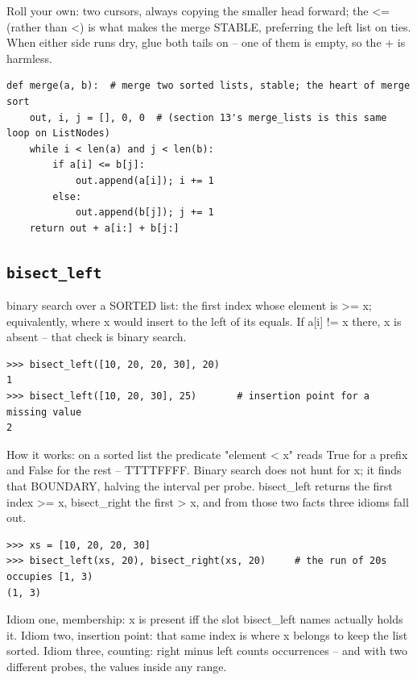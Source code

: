 \documentclass[10pt,letterpaper]{book}
\begin{document}
Roll your own: two cursors, always copying the smaller head forward; the <= (rather than <) is what makes the merge STABLE, preferring the left list on ties. When either side runs dry, glue both tails on -- one of them is empty, so the + is harmless.

\begin{lstlisting}[style=ex]
def merge(a, b):  # merge two sorted lists, stable; the heart of merge sort
    out, i, j = [], 0, 0  # (section 13's merge_lists is this same loop on ListNodes)
    while i < len(a) and j < len(b):
        if a[i] <= b[j]:
            out.append(a[i]); i += 1
        else:
            out.append(b[j]); j += 1
    return out + a[i:] + b[j:]
\end{lstlisting}

\subsection{\texttt{bisect\_left}}\label{def:bisect-left}
binary search over a SORTED list: the first index whose element is >= x; equivalently, where x would insert to the left of its equals. If a[i] != x there, x is absent -- that check is binary search.
\begin{lstlisting}[style=ex]
>>> bisect_left([10, 20, 20, 30], 20)
1
>>> bisect_left([10, 20, 30], 25)       # insertion point for a missing value
2
\end{lstlisting}

How it works: on a sorted list the predicate "element < x" reads True for a prefix and False for the rest -- TTTTFFFF. Binary search does not hunt for x; it finds that BOUNDARY, halving the interval per probe. bisect\_left returns the first index >= x, bisect\_right the first > x, and from those two facts three idioms fall out.

\begin{lstlisting}[style=ex]
>>> xs = [10, 20, 20, 30]
>>> bisect_left(xs, 20), bisect_right(xs, 20)     # the run of 20s occupies [1, 3)
(1, 3)
\end{lstlisting}

Idiom one, membership: x is present iff the slot bisect\_left names actually holds it. Idiom two, insertion point: that same index is where x belongs to keep the list sorted. Idiom three, counting: right minus left counts occurrences -- and with two different probes, the values inside any range.
\end{document}
